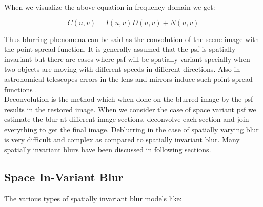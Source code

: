 \documentclass{article}
\begin{document}
When we visualize the above equation in frequency domain we get: 

\begin{equation}
    C(u, v) = I(u, v)D(u, v) + N(u, v)
\end{equation}

Thus blurring phenomena can be said as the convolution of the scene image with the point spread function. It is generally assumed that the psf is spatially invariant but there are cases where psf will be spatially variant specially when two objects are moving with different speeds in different directions. Also in astronomical telescopes errors in the lens and mirrors induce such point spread functions \cite{5}.\\

Deconvolution is the method which when done on the blurred image by the psf results in the restored image. When we consider the case of space variant psf we estimate the blur at different image sections, deconvolve each section and join everything to get the final image. Deblurring in the case of spatially varying blur is very difficult and complex as compared to spatially invariant blur. Many spatially invariant blurs have been discussed in following sections.

\subsection{Space In-Variant Blur}

The various types of spatially invariant blur models like: 
\end{document}
